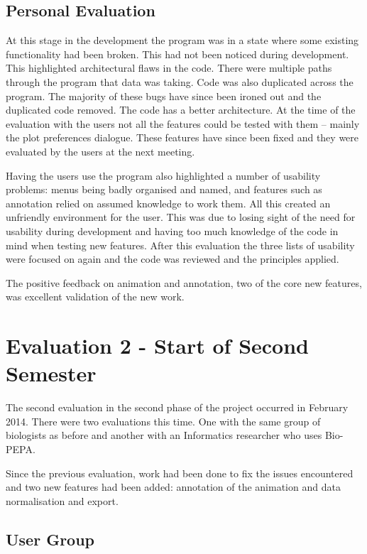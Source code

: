 \subsection{Personal Evaluation}

At this stage in the development the program was in a state where some existing functionality had been broken.  This had not been noticed during development.  This highlighted architectural flaws in the code.  There were multiple paths through the program that data was taking.  Code was also duplicated across the program.  The majority of these bugs have since been ironed out and the duplicated code removed. The code has a better architecture.  At the time of the evaluation with the users not all the features could be tested with them -- mainly the plot preferences dialogue.  These features have since been fixed and they were evaluated by the users at the next meeting.

Having the users use the program also highlighted a number of usability problems: menus being badly organised and named, and features such as annotation relied on assumed knowledge to work them.  All this created an unfriendly environment for the user.  This was due to losing sight of the need for usability during development and having too much knowledge of the code in mind when testing new features.  After this evaluation the three lists of usability~\cite{shgold}\cite{normsev}\cite{neilten} were focused on again and the code was reviewed and the principles applied.

The positive feedback on animation and annotation, two of the core new features, was excellent validation of the new work.

\section{Evaluation 2 - Start of Second Semester}
\label{sec:eval2}

The second evaluation in the second phase of the project occurred in February 2014.  There were two evaluations this time.  One with the same group of biologists as before and another with an Informatics researcher who uses Bio-PEPA.

Since the previous evaluation, work had been done to fix the issues encountered and two new features had been added: annotation of the animation and data normalisation and export.

\subsection{User Group}

